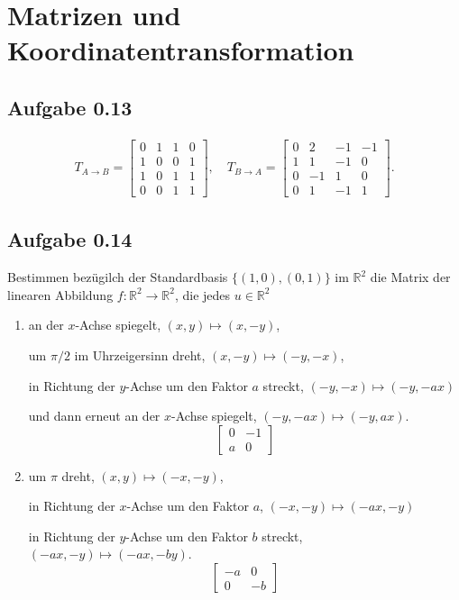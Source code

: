 \section*{Matrizen und Koordinatentransformation}
\subsection*{Aufgabe 0.13}
\begin{align*}
  T_{A \to B} =
  \begin{bmatrix}
    0 & 1 & 1 & 0 \\
    1 & 0 & 0 & 1 \\
    1 & 0 & 1 & 1 \\
    0 & 0 & 1 & 1
  \end{bmatrix},
  \quad
  T_{B \to A} =
  \begin{bmatrix}
    0 & 2 & -1 & -1 \\
    1 & 1 & -1 & 0 \\
    0 & -1 & 1 & 0 \\
    0 & 1 & -1 & 1
  \end{bmatrix}.
\end{align*}
\subsection*{Aufgabe 0.14}
Bestimmen bezügilch der Standardbasis \(\{(1, 0), (0, 1)\}\) im
\(\mathbb{R}^{2}\) die Matrix der linearen Abbildung
\(f\colon \mathbb{R}^{2} \to \mathbb{R}^{2}\), die jedes \(u \in \mathbb{R}^{2}\)
\begin{enumerate}
\item an der \(x\)-Achse spiegelt, \((x, y) \mapsto (x, -y)\),

  um \(\pi/2\) im Uhrzeigersinn dreht, \((x, -y) \mapsto (-y, -x)\),

  in Richtung der \(y\)-Achse um den Faktor \(a\) streckt, \((-y, -x)
  \mapsto (-y, -ax)\)

  und dann erneut an der \(x\)-Achse spiegelt, \((-y, -ax) \mapsto (-y,
  ax)\).
  \[
    \begin{bmatrix}
      0 & -1 \\
      a & 0
    \end{bmatrix}
  \]
\item um \(\pi\) dreht, \((x, y) \mapsto (-x, -y)\),

  in Richtung der \(x\)-Achse um den Faktor \(a\), \((-x, -y) \mapsto (-ax,
  -y)\)

  in Richtung der \(y\)-Achse um den Faktor \(b\) streckt, \((-ax,
  -y) \mapsto (-ax, -by)\).
  \[
    \begin{bmatrix}
      -a & 0 \\
      0 & -b
    \end{bmatrix}
  \]
\end{enumerate}
